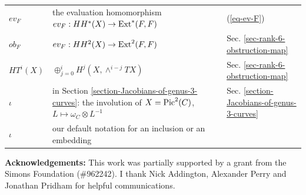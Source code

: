 \documentclass[12pt]{amsart}
\numberwithin{equation}{subsection}
\theoremstyle{plain}
\theoremstyle{definition}
\newcommand{\Pic}{{\rm Pic}}
\newcommand{\Ext}{{\rm Ext}}
\begin{document}
\begin{longtable}{l l l}
\\
$ev_F$ & the evaluation homomorphism $ev_F:HH^*(X)\rightarrow \Ext^*(F,F)$ & (\ref{eq-ev-F})
\\
$ob_F$ & $ev_F:HH^2(X)\rightarrow \Ext^2(F,F)$ & Sec. \ref{sec-rank-6-obstruction-map}
\\
$HT^i(X)$ & $\oplus_{j=0}^i H^j(X,\wedge^{i-j}TX)$ & Sec. \ref{sec-rank-6-obstruction-map}
\\
$\iota$ & in Section \ref{section-Jacobians-of-genus-3-curves}: the involution of $X=\Pic^2(C)$, $L\mapsto \omega_C\otimes L^{-1}$ & Sec. \ref{section-Jacobians-of-genus-3-curves}
\\
$\iota$ & our default notation for an inclusion or an embedding 


\end{longtable}

\normalsize
%
{\bf Acknowledgements:}
This work was partially supported by a grant  from the Simons Foundation (\#962242). 
I thank Nick Addington, Alexander Perry and Jonathan Pridham for helpful communications.



\end{document}
